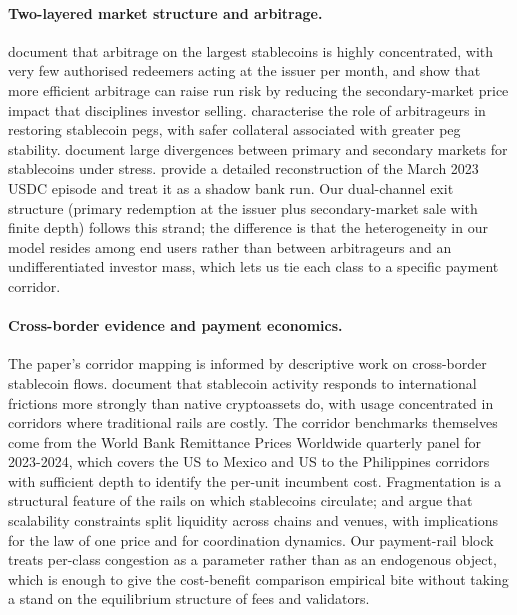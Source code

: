 \paragraph{Two-layered market structure and arbitrage.} \citet{ma_zeng_zhang_2025} document that arbitrage on the largest stablecoins is highly concentrated, with very few authorised redeemers acting at the issuer per month, and show that more efficient arbitrage can raise run risk by reducing the secondary-market price impact that disciplines investor selling. \citet{lyons_viswanath_natraj_2023} characterise the role of arbitrageurs in restoring stablecoin pegs, with safer collateral associated with greater peg stability. \citet{watsky_etal_2024} document large divergences between primary and secondary markets for stablecoins under stress. \citet{du_sonawane_watsky_2025} provide a detailed reconstruction of the March 2023 USDC episode and treat it as a shadow bank run. Our dual-channel exit structure (primary redemption at the issuer plus secondary-market sale with finite depth) follows this strand; the difference is that the heterogeneity in our model resides among end users rather than between arbitrageurs and an undifferentiated investor mass, which lets us tie each class to a specific payment corridor.

\paragraph{Cross-border evidence and payment economics.} The paper's corridor mapping is informed by descriptive work on cross-border stablecoin flows. \citet{auer_lewrick_paulick_2024_defiying_gravity} document that stablecoin activity responds to international frictions more strongly than native cryptoassets do, with usage concentrated in corridors where traditional rails are costly. The corridor benchmarks themselves come from the World Bank Remittance Prices Worldwide quarterly panel for 2023-2024, which covers the US to Mexico and US to the Philippines corridors with sufficient depth to identify the per-unit incumbent cost. Fragmentation is a structural feature of the rails on which stablecoins circulate; \citet{shin_2026_tokenomics_fragmentation} and \citet{boissay_cornelli_doerr_frost_2022} argue that scalability constraints split liquidity across chains and venues, with implications for the law of one price and for coordination dynamics. Our payment-rail block treats per-class congestion as a parameter rather than as an endogenous object, which is enough to give the cost-benefit comparison empirical bite without taking a stand on the equilibrium structure of fees and validators.

